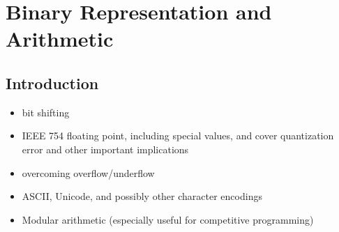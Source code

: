 \section{Binary Representation and Arithmetic}%
\label{sec:fundamentals--binary-and-arithmetic}

\subsection{Introduction}


\begin{itemize}
    \item bit shifting
    \item IEEE 754 floating point, including special values, and cover quantization error and other important implications
    \item overcoming overflow/underflow
    \item ASCII, Unicode, and possibly other character encodings
    \item Modular arithmetic (especially useful for competitive programming)
\end{itemize}


